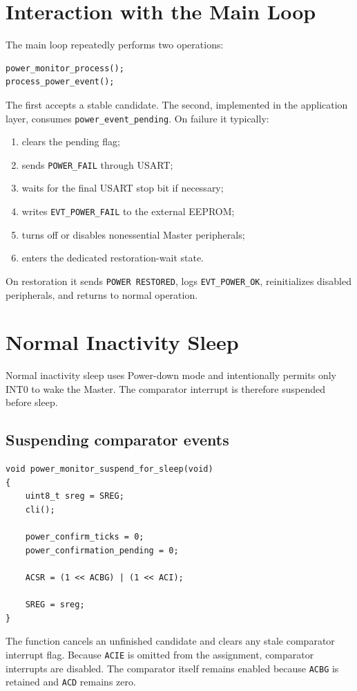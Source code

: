 \documentclass[11pt,a4paper]{article}
\begin{document}
\section{Interaction with the Main Loop}
The main loop repeatedly performs two operations:
\begin{lstlisting}[style=cstyle]
power_monitor_process();
process_power_event();
\end{lstlisting}
The first accepts a stable candidate. The second, implemented in the application layer, consumes \texttt{power\_event\_pending}. On failure it typically:
\begin{enumerate}
  \item clears the pending flag;
  \item sends \texttt{POWER\_FAIL} through USART;
  \item waits for the final USART stop bit if necessary;
  \item writes \texttt{EVT\_POWER\_FAIL} to the external EEPROM;
  \item turns off or disables nonessential Master peripherals;
  \item enters the dedicated restoration-wait state.
\end{enumerate}
On restoration it sends \texttt{POWER RESTORED}, logs \texttt{EVT\_POWER\_OK}, reinitializes disabled peripherals, and returns to normal operation.

\section{Normal Inactivity Sleep}
Normal inactivity sleep uses Power-down mode and intentionally permits only INT0 to wake the Master. The comparator interrupt is therefore suspended before sleep.

\subsection{Suspending comparator events}

\begin{lstlisting}[style=cstyle]
void power_monitor_suspend_for_sleep(void)
{
    uint8_t sreg = SREG;
    cli();

    power_confirm_ticks = 0;
    power_confirmation_pending = 0;

    ACSR = (1 << ACBG) | (1 << ACI);

    SREG = sreg;
}
\end{lstlisting}

The function cancels an unfinished candidate and clears any stale comparator interrupt flag. Because \texttt{ACIE} is omitted from the assignment, comparator interrupts are disabled. The comparator itself remains enabled because \texttt{ACBG} is retained and \texttt{ACD} remains zero.
\end{document}
